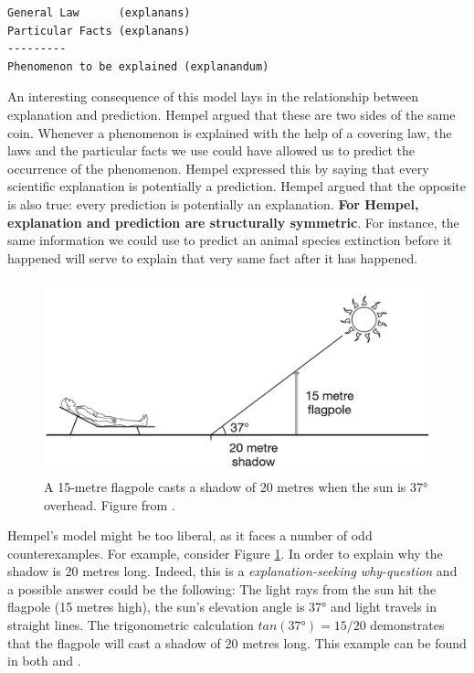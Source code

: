 \documentclass[
]{book}
\begin{document}
\begin{verbatim}
General Law      (explanans)
Particular Facts (explanans)
---------
Phenomenon to be explained (explanandum)
\end{verbatim}

An interesting consequence of this model lays in the relationship between explanation and prediction. Hempel argued that these are two sides of the same coin. Whenever a phenomenon is explained with the help of a covering law, the laws and the particular facts we use could have allowed us to predict the occurrence of the phenomenon. Hempel expressed this by saying that every scientific explanation is potentially a prediction. Hempel argued that the opposite is also true: every prediction is potentially an explanation. \textbf{For Hempel, explanation and prediction are structurally symmetric}. For instance, the same information we could use to predict an animal species extinction before it happened will serve to explain that very same fact after it has happened.



\begin{figure}

{\centering \includegraphics[width=0.75\linewidth]{Figures/flagpole} 

}

\caption{A 15-metre flagpole casts a shadow of 20 metres when the sun is 37° overhead. Figure from \citep{okasha-pos}.}\label{fig:flagpole}
\end{figure}

Hempel's model might be too liberal, as it faces a number of odd counterexamples. For example, consider Figure \ref{fig:flagpole}. In order to explain why the shadow is 20 metres long. Indeed, this is a \emph{explanation-seeking why-question} and a possible answer could be the following: The light rays from the sun hit the flagpole (15 metres high), the sun's elevation angle is 37° and light travels in straight lines. The trigonometric calculation \(tan(37°) = 15/20\) demonstrates that the flagpole will cast a shadow of 20 metres long. This example can be found in both \citep{rosenberg2019philosophy} and \citep{okasha-pos}.
\end{document}
